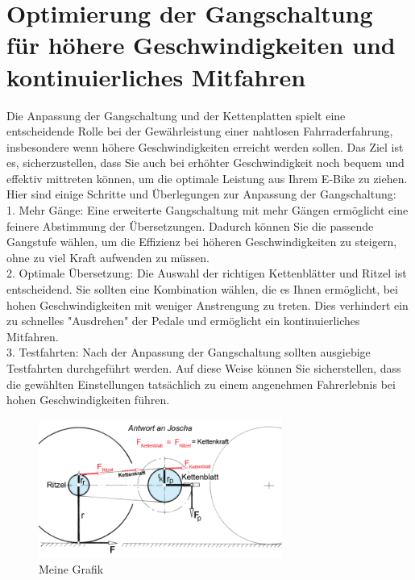 
\chapter{Optimierung der Gangschaltung für höhere Geschwindigkeiten und kontinuierliches Mitfahren}


Die Anpassung der Gangschaltung und der Kettenplatten spielt eine entscheidende Rolle bei der Gewährleistung einer nahtlosen Fahrraderfahrung, insbesondere wenn höhere Geschwindigkeiten erreicht werden sollen. Das Ziel ist es, sicherzustellen, dass Sie auch bei erhöhter Geschwindigkeit noch bequem und effektiv mittreten können, um die optimale Leistung aus Ihrem E-Bike zu ziehen.\\

Hier sind einige Schritte und Überlegungen zur Anpassung der Gangschaltung:\\

    1. Mehr Gänge: Eine erweiterte Gangschaltung mit mehr Gängen ermöglicht eine feinere Abstimmung der Übersetzungen. Dadurch können Sie die passende Gangstufe wählen, um die Effizienz bei höheren Geschwindigkeiten zu steigern, ohne zu viel Kraft aufwenden zu müssen.\\

    2. Optimale Übersetzung: Die Auswahl der richtigen Kettenblätter und Ritzel ist entscheidend. Sie sollten eine Kombination wählen, die es Ihnen ermöglicht, bei hohen Geschwindigkeiten mit weniger Anstrengung zu treten. Dies verhindert ein zu schnelles "Ausdrehen" der Pedale und ermöglicht ein kontinuierliches Mitfahren.\\

    3. Testfahrten: Nach der Anpassung der Gangschaltung sollten ausgiebige Testfahrten durchgeführt werden. Auf diese Weise können Sie sicherstellen, dass die gewählten Einstellungen tatsächlich zu einem angenehmen Fahrerlebnis bei hohen Geschwindigkeiten führen.\\


\begin{figure}[h]
    \centering
    \includegraphics[width=8cm]{images/fahrrad_kraefte_gross.png}
    \caption{Meine Grafik}
    \label{fig:meine-grafik}
\end{figure}

